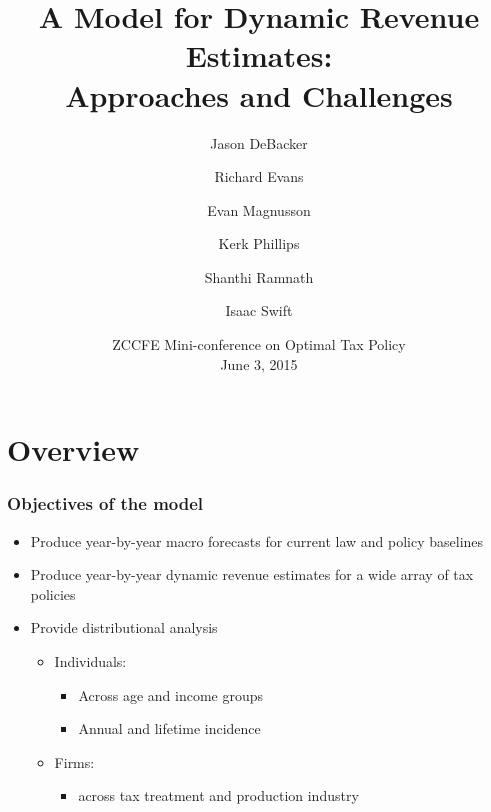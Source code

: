 \documentclass{beamer}
\title[OSPC Dynamic Scoring Model]
{A Model for Dynamic Revenue Estimates:\\
Approaches and Challenges}
\author%
{Jason DeBacker \and Richard Evans \and Evan Magnusson \and Kerk Phillips \and Shanthi Ramnath \and Isaac Swift}
\date[Short Occasion] %
{ZCCFE Mini-conference on Optimal Tax Policy\\
June 3, 2015}
\begin{document}
\begin{frame}
  \titlepage
\end{frame}


\section{Overview}

  \begin{frame}
  \frametitle{Objectives of the model}
    \begin{itemize}
      \item Produce year-by-year macro forecasts for current law and policy baselines
      \vspace{3mm}
      \item Produce year-by-year dynamic revenue estimates for a wide array of tax policies
      \vspace{3mm}
      \item Provide distributional analysis
        \vspace{2mm}
      	\begin{itemize}
          \item Individuals:
      		  \begin{itemize}
      		    \item Across age and income groups
      		    \vspace{1mm}
              \item Annual and lifetime incidence
      		  \end{itemize}
          \vspace{2mm}
      	  \item Firms:
            \vspace{2mm}
            \begin{itemize}
              \item across tax treatment and production industry
            \end{itemize}
      	\end{itemize}
    \end{itemize}
  \end{frame}
\end{document}
